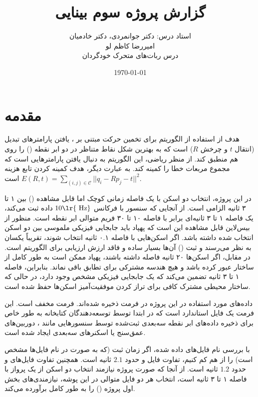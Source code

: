 \documentclass[12pt,a4paper]{article}
\title{گزارش پروژه سوم بینایی \lr{LiDAR ICP}}
\author{استاد درس:‌ دکتر جوانمردی، دکتر خادمیان \\ امیررضا کاظم لو \\ \small درس ربات‌های متحرک خودگردان \\}
\date{\today}
\begin{document}
	\maketitle
	
	\section{مقدمه }
	هدف از استفاده از الگوریتم  برای تخمین حرکت مبتنی بر ، یافتن پارامترهای تبدیل (انتقال $t$ و چرخش $R$) است که به بهترین شکل نقاط متناظر در دو ابر نقطه () را روی هم منطبق کند. از منظر ریاضی، این الگوریتم به دنبال یافتن پارامترهایی است که مجموع مربعات خطا را کمینه کند. به عبارت دیگر، هدف کمینه کردن تابع هزینه $E(R,t)=\sum_{(i,j)\in\mathcal{C}}||q_i-Rp_j-t||^2$ است.
	
	در این پروژه، انتخاب دو اسکن  با یک فاصله زمانی کوچک اما قابل مشاهده () بین ۱ تا ۳ ثانیه الزامی است. از آنجایی که سنسور  با فرکانس $10\text{\lr{ Hz}}$ داده ثبت می‌کند، یک فاصله ۱ تا ۳ ثانیه‌ای برابر با فاصله ۱۰ تا ۳۰ فریم متوالی ابر نقطه است. منظور از بیس‌لاین قابل مشاهده این است که پهپاد باید جابجایی فیزیکی ملموسی بین دو اسکن انتخاب شده داشته باشد. اگر اسکن‌هایی با فاصله ۰.۱ ثانیه انتخاب شوند، تقریباً یکسان به نظر می‌رسند و ثبت () آن‌ها بسیار ساده و فاقد ارزش ارزیابی برای الگوریتم  است. در مقابل، اگر اسکن‌ها ۲۰ ثانیه فاصله داشته باشند، پهپاد ممکن است به طور کامل از ساختار عبور کرده باشد و هیچ هندسه مشترکی برای تطابق باقی نماند. بنابراین، فاصله ۱ تا ۳ ثانیه تضمین می‌کند که یک جابجایی فیزیکی مشخص وجود دارد، در حالی که ساختار محیطی مشترک کافی برای تراز کردن موفقیت‌آمیز اسکن‌ها حفظ شده است.
	
	داده‌های مورد استفاده در این پروژه در فرمت  ذخیره شده‌اند. فرمت  مخفف  است. این فرمت یک فایل استاندارد است که در ابتدا توسط توسعه‌دهندگان کتابخانه  به طور خاص برای ذخیره داده‌های ابر نقطه سه‌بعدی ثبت‌شده توسط سنسورهایی مانند ، دوربین‌های عمق‌سنج یا اسکنرهای سه‌بعدی ایجاد شده است.
	
	با بررسی نام فایل‌های داده شده، اگر زمان ثبت (که به صورت  در نام فایل‌ها مشخص است) را از هم کم کنیم، تفاوت فایل  و  حدود $2.1$ ثانیه است. همچنین تفاوت فایل‌های  و  حدود $1.2$ ثانیه است. از آنجا که صورت پروژه نیازمند انتخاب دو اسکن از یک پرواز با فاصله ۱ تا ۳ ثانیه است، انتخاب هر دو فایل متوالی در این پوشه، نیازمندی‌های بخش اول پروژه () را به طور کامل برآورده می‌کند. 
	
\end{document}

